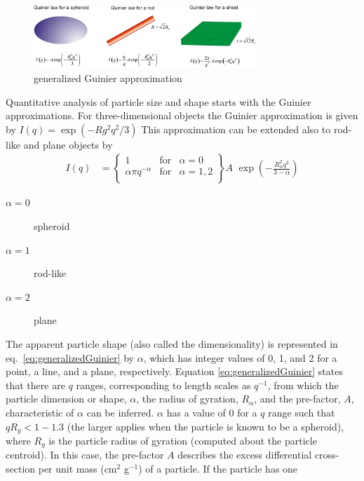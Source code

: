 \begin{figure}[htb]
\begin{center}
\includegraphics[width=0.75\textwidth,height=0.25\textwidth]{generalizedGuinier_q.png}
\end{center}
\caption{generalized Guinier approximation}
\end{figure}
Quantitative analysis of particle size and shape starts with the
Guinier approximations. For three-dimensional objects the Guinier
approximation is given by $I(q) = \exp(-Rg^2q^2/3)$ This
approximation can be extended also to rod-like and plane objects by
\begin{align}
I(q) &= \left\{
\begin{array}{lll}
  1 & \mbox{for} & \alpha=0 \\
  \alpha \pi q^{-\alpha} & \mbox{for} & \alpha=1,2 \\
\end{array}
\right\} A \,\, \exp\left(-\frac{R_\alpha^2 q^2}{3-\alpha}\right)
\label{eq:generalizedGuinier}
\end{align}
\begin{description}
\item[$\alpha=0$] spheroid
\item[$\alpha=1$] rod-like
\item[$\alpha=2$] plane
\end{description}
The apparent particle shape (also called the dimensionality) is
represented in eq.\ \ref{eq:generalizedGuinier} by $\alpha$, which
has integer values of 0, 1, and 2 for a point, a line, and a plane,
respectively. Equation \ref{eq:generalizedGuinier} states that there
are $q$ ranges, corresponding to length scales as $q^{-1}$, from
which the particle dimension or shape, $\alpha$, the radius of
gyration, $R_\alpha$, and the pre-factor, $A$, characteristic of
$\alpha$ can be inferred. $\alpha$ has a value of 0 for a $q$ range
such that $qR_g < 1-1.3$ (the larger applies when the particle is
known to be a spheroid), where $R_g$ is the particle radius of
gyration (computed about the particle centroid). In this case, the
pre-factor $A$ describes the excess differential cross-section per
unit mass (cm$^2$ g$^{-1}$) of a particle. If the particle has one
